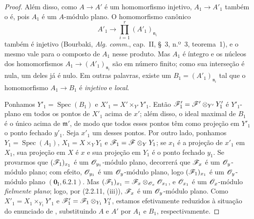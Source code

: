 \begin{proof}
Além disso, como $A\to A'$
é um homomorfismo injetivo,
$A_1\to A'_1$ também o é,
pois $A_1$ é um $A$-módulo
plano. O homomorfismo canônico
\[
A'_1\longrightarrow
\prod_{i=1}^{r}(A'_1)_{\mathfrak n_i}
\]
também é injetivo (Bourbaki,
\emph{Alg. comm.}, cap.~II,
\S~3, n.º~3, teorema~1),
e o mesmo vale para o composto
de $A_1$ nesse produto. Mas
$A_1$ é íntegro e os núcleos
dos homomorfismos
$A_1\to(A'_1)_{\mathfrak n_i}$
são em número finito; como
sua interseção é nula, um
deles já é nulo. Em outras
palavras, existe um
$B_1=(A'_1)_{\mathfrak n_i}$
tal que o homomorfismo
$A_1\to B_1$ é \emph{injetivo}
e \emph{local}.

Ponhamos
$Y'_1=\operatorname{Spec}(B_1)$
e $X'_1=X'\times_{Y'}Y'_1$.
Então
$\mathscr{F}'_1=\mathscr{F}'\otimes_{Y'}Y'_1$
é $Y'_1$-plano em todos os
pontos de $X'_1$ acima de
$x'$; além disso, o ideal
maximal de $B_1$ é o único
acima de $\mathfrak m'$,
de modo que todos esses pontos
têm como projeção em $Y'_1$
o ponto fechado $y'_1$. Seja
$x'_1$ um desses pontos.
Por outro lado, ponhamos
$Y_1=\operatorname{Spec}(A_1)$,
$X_1=X\times_Y Y_1$ e
$\mathscr{F}_1=\mathscr{F}\otimes_Y Y_1$;
se $x_1$ é a projeção de $x'_1$
em $X_1$, sua projeção em
$X$ é $x$ e sua projeção em
$Y_1$ é o ponto fechado $y_1$.
Se provarmos que
$(\mathscr{F}_1)_{x_1}$ é um
$\mathscr{O}_{y_1}$-módulo plano,
decorrerá que $\mathscr{F}_x$ é um
$\mathscr{O}_y$-módulo plano; com
efeito, $\mathscr{O}_{y_1}$ é um
$\mathscr{O}_y$-módulo plano,
logo $(\mathscr{F}_1)_{x_1}$ é um
$\mathscr{O}_y$-módulo plano
$(\mathbf 0_{\mathrm I},6.2.1)$.
Mas $(\mathscr{F}_1)_{x_1}
=\mathscr{F}_x\otimes_{\mathscr{O}_x}
\mathscr{O}_{x_1}$, e $\mathscr{O}_{x_1}$
é um $\mathscr{O}_x$-módulo
\emph{fielmente plano}; logo,
por (2.2.11, (iii)),
$\mathscr{F}_x$ é um
$\mathscr{O}_y$-módulo plano.
Como $X'_1=X_1\times_{Y_1}Y'_1$
e $\mathscr{F}'_1=\mathscr{F}_1
\otimes_{Y_1}Y'_1$, estamos
efetivamente reduzidos à
situação do enunciado de
, substituindo
$A$ e $A'$ por $A_1$ e $B_1$,
respectivamente.


\end{proof}
